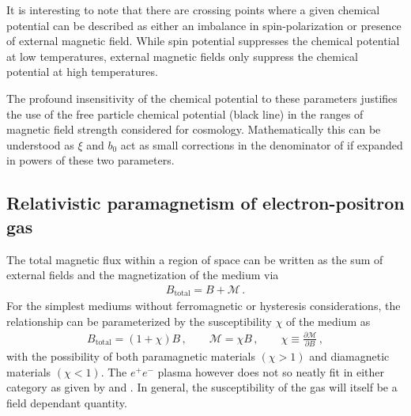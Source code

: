 It is interesting to note that there are crossing points where a given chemical potential can be described as either an imbalance in spin-polarization or presence of external magnetic field. While spin potential suppresses the chemical potential at low temperatures, external magnetic fields only suppress the chemical potential at high temperatures.

The profound insensitivity of the chemical potential to these parameters justifies the use of the free particle chemical potential (black line) in the ranges of magnetic field strength considered for cosmology. Mathematically this can be understood as $\xi$ and $b_{0}$ act as small corrections in the denominator of  if expanded in powers of these two parameters.

\subsection{Relativistic paramagnetism of electron-positron gas}
\label{sec:magnetization}
\noindent The total magnetic flux within a region of space can be written as the sum of external fields and the magnetization of the medium via
\begin{align}
 \label{totalmag}
 {B}_\mathrm{total} = {B} + \mathcal{M}\,.
\end{align}
For the simplest mediums without ferromagnetic or hysteresis considerations, the relationship can be parameterized by the susceptibility $\chi$ of the medium as
\begin{align}
 \label{susceptibility}
 {B}_\mathrm{total} = (1+\chi){B}\,,\qquad \mathcal{M} = \chi{B}\,,\qquad \chi\equiv\frac{\partial\mathcal{M}}{\partial{B}}\,,
\end{align}
with the possibility of both paramagnetic materials $(\chi>1)$ and diamagnetic materials $(\chi<1)$. The $e^{+}e^{-}$ plasma however does not so neatly fit in either category as given by  and . In general, the susceptibility of the gas will itself be a field dependant quantity.

